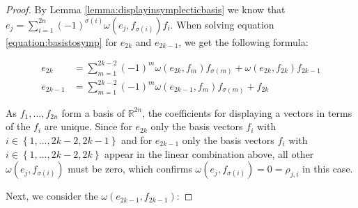\documentclass[../SymplecticSimplices.tex]{subfiles}
\begin{document}
\begin{proof}
  By Lemma \ref{lemma:displayinsymplecticbasis} we know that \( e_j = \sum _{i = 1} ^{2n} \left( -1 \right)^{\sigma \left( i \right)} \omega \left( e_j, f_{\sigma \left( i \right)} \right) f_i \). When solving equation \eqref{equation:basistosymp} for \( e_{2k} \) and \( e_{2k-1} \), we get the following formula:
  
  \begin{equation*}
    \begin{split}
      e_{2k} & = \sum \limits _{m=1}^{2k-2} \left( -1 \right)^{m} \omega \left( e_{2k}, f_m \right) f_{\sigma \left( m \right)} + \omega \left( e_{2k}, f_{2k} \right) f_{2k-1} \\
      e_{2k-1} & = \sum \limits _{m=1}^{2k-2} \left( -1 \right)^{m} \omega \left( e_{2k-1}, f_m \right) f_{\sigma \left( m \right)} + f_{2k}
    \end{split}
  \end{equation*}

  As \( f_1, \dots, f_{2n} \) form a basis of \( \mathbb{R}^{2n} \), the coefficients for displaying a vectors in terms of the \( f_i \) are unique. Since for \( e_{2k} \) only the basis vectors \( f_i \) with \( i \in \left\lbrace 1, \dots, 2k-2, 2k-1 \right\rbrace \) and for \( e_{2k-1} \) only the basis vectors \( f_i \) with \( i \in \left\lbrace 1, \dots, 2k-2, 2k \right\rbrace \) appear in the linear combination above, all other \( \omega \left( e_j, f_{\sigma \left( i \right)} \right) \) must be zero, which confirms \( \omega \left( e_j, f_{\sigma \left( i \right)} \right) = 0 = \rho_{j,i} \) in this case.

  Next, we consider the \( \omega \left( e_{2k-1}, f_{2k-1} \right) \):


\end{proof}
\end{document}

